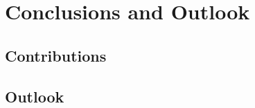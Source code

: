 \chapter*{Conclusions and Outlook}\label{chp8:conclusion}
{


\section*{Contributions}


\section*{Outlook}

}